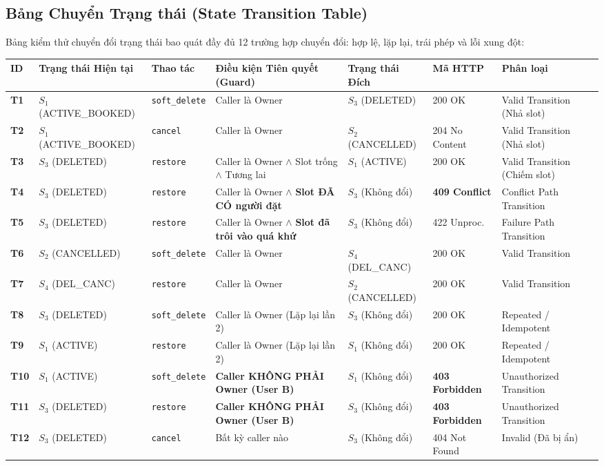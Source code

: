 \documentclass[10pt,a4paper]{article}
\newcommand{\hd}[1]{\sffamily\bfseries\scriptsize #1}
\begin{document}
\subsection{Bảng Chuyển Trạng thái (State Transition Table)}
Bảng kiểm thử chuyển đổi trạng thái bao quát đầy đủ 12 trường hợp chuyển đổi: hợp lệ, lặp lại, trái phép và lỗi xung đột:

\vspace{0.8pt}
\scriptsize
\begin{tabularx}{\linewidth}{@{}P{0.5cm}P{2.2cm}P{1.6cm}P{3.4cm}P{2.2cm}P{1.6cm}Y@{}}
\toprule
{}\hd{ID} & \hd{Trạng thái Hiện tại} & \hd{Thao tác} & \hd{Điều kiện Tiên quyết (Guard)} & \hd{Trạng thái Đích} & \hd{Mã HTTP} & \hd{Phân loại} \\
\midrule
\textbf{T1} & $S_1$ (ACTIVE\_BOOKED) & \texttt{soft\_delete} & Caller là Owner & $S_3$ (DELETED) & 200 OK & Valid Transition (Nhả slot) \\
\textbf{T2} & $S_1$ (ACTIVE\_BOOKED) & \texttt{cancel} & Caller là Owner & $S_2$ (CANCELLED) & 204 No Content & Valid Transition (Nhả slot) \\
\textbf{T3} & $S_3$ (DELETED) & \texttt{restore} & Caller là Owner $\land$ Slot trống $\land$ Tương lai & $S_1$ (ACTIVE) & 200 OK & Valid Transition (Chiếm slot) \\
\textbf{T4} & $S_3$ (DELETED) & \texttt{restore} & Caller là Owner $\land$ \textbf{Slot ĐÃ CÓ người đặt} & $S_3$ (Không đổi) & \textbf{409 Conflict} & Conflict Path Transition \\
\textbf{T5} & $S_3$ (DELETED) & \texttt{restore} & Caller là Owner $\land$ \textbf{Slot đã trôi vào quá khứ} & $S_3$ (Không đổi) & 422 Unproc. & Failure Path Transition \\
\textbf{T6} & $S_2$ (CANCELLED) & \texttt{soft\_delete} & Caller là Owner & $S_4$ (DEL\_CANC) & 200 OK & Valid Transition \\
\textbf{T7} & $S_4$ (DEL\_CANC) & \texttt{restore} & Caller là Owner & $S_2$ (CANCELLED) & 200 OK & Valid Transition \\
\textbf{T8} & $S_3$ (DELETED) & \texttt{soft\_delete} & Caller là Owner (Lặp lại lần 2) & $S_3$ (Không đổi) & 200 OK & Repeated / Idempotent \\
\textbf{T9} & $S_1$ (ACTIVE) & \texttt{restore} & Caller là Owner (Lặp lại lần 2) & $S_1$ (Không đổi) & 200 OK & Repeated / Idempotent \\
\textbf{T10} & $S_1$ (ACTIVE) & \texttt{soft\_delete} & \textbf{Caller KHÔNG PHẢI Owner (User B)} & $S_1$ (Không đổi) & \textbf{403 Forbidden} & Unauthorized Transition \\
\textbf{T11} & $S_3$ (DELETED) & \texttt{restore} & \textbf{Caller KHÔNG PHẢI Owner (User B)} & $S_3$ (Không đổi) & \textbf{403 Forbidden} & Unauthorized Transition \\
\textbf{T12} & $S_3$ (DELETED) & \texttt{cancel} & Bất kỳ caller nào & $S_3$ (Không đổi) & 404 Not Found & Invalid (Đã bị ẩn) \\
\bottomrule
\end{tabularx}
\end{document}
